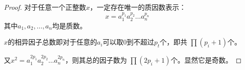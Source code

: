 \begin{proof}
    对于任意一个正整数$x$，一定存在唯一的质因数表示：
    $$x=a_1^{p_1}a_2^{p_2}\ldots a_n^{p_n}$$
    其中$a_1,a_2,\ldots,a_n$均是质数。

    $x$的相异因子总数即对于任意的$a_i$可以取$0$到不超过$p_t$个，即共
    $\prod (p_i+1)$个。

    又$x^2=a_1^{2p_1}a_2^{2p_2}\ldots a_n^{2p_n}$，则其总的因子数为
    $\prod (2p_i+1)$个。显然它是奇数。
\end{proof}